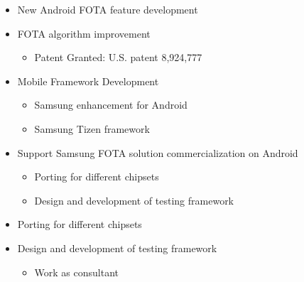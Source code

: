 \documentclass[11pt,a4paper,sans]{moderncv}        %
\begin{document}
%
\begin{itemize}%
\item New Android FOTA feature development
\item FOTA algorithm improvement
  \begin{itemize}%
  \item Patent Granted: U.S. patent 8,924,777 
  \end{itemize}
\item Mobile Framework Development
  \begin{itemize}%
  \item Samsung enhancement for Android
  \item Samsung Tizen framework
  \end{itemize}
\item Support Samsung FOTA solution commercialization on Android
  \begin{itemize}%
  \item Porting for different chipsets
  \item Design and development of testing framework\\
  \end{itemize}
\end{itemize}
%
\begin{itemize}%
  \item Porting for different chipsets
  \item Design and development of testing framework\\
  \begin{itemize}%
  \item Work as consultant
  \end{itemize}
\end{itemize}
\end{document}
